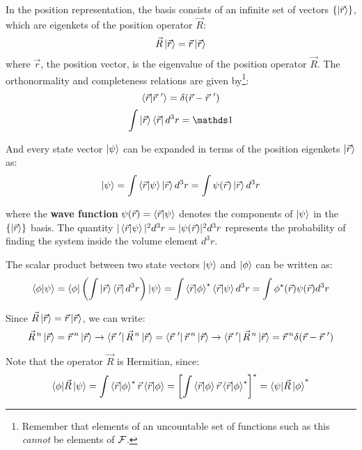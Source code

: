 In the position representation, the basis consists of an infinite set of vectors $\{\ket{\vec{r}}\}$, which are eigenkets of the position operator $\vec{R}$:
\begin{equation}
    \vec{R}\ket{\vec{r}} = \vec{r}\ket{\vec{r}}
\end{equation}
where $\vec{r}$, the position vector, is the eigenvalue of the position operator $\vec{R}$. The orthonormality and completeness relations are given by\footnote{Remember that elements of an uncountable set of functions such as this \textit{cannot} be elements of $\mathcal{F}$.}:
\begin{equation}
    \braket{\vec{r}|\vec{r}\ '} = \delta(\vec{r} - \vec{r}\ ')
\end{equation} 
\begin{equation}
    \int \ket{\vec{r}}\bra{\vec{r}} d^3r = \Imat
\end{equation}

And every state vector $\ket{\psi}$ can be expanded in terms of the position eigenkets $\ket{\vec{r}}$ as:
\begin{equation}
    \ket{\psi} = \int \braket{\vec{r}|\psi} \ket{\vec{r}} d^3 r = \int \psi(\vec{r}) \ket{\vec{r}} d^3 r
\end{equation}

where the \textbf{wave function} $\psi(\vec{r}) = \braket{\vec{r}|\psi}$ denotes the components of $\ket{\psi}$ in the $\{\ket{\vec{r}}\}$ basis. The quantity $|\braket{\vec{r}|\psi}|^2d^3 r = |\psi(\vec{r})|^2d^3r$ represents the probability of finding the system inside the volume element $d^3r$.

The scalar product between two state vectors $\ket{\psi}$ and $\ket{\phi}$ can be written as:
\begin{equation}
    \braket{\phi|\psi} = \bra{\phi}\left(\int \ket{\vec{r}}\bra{\vec{r}}d^3r\right)\ket{\psi} = \int \braket{\vec{r}|\phi}^*\braket{\vec{r}|\psi} d^3r = \int \phi^*(\vec{r})\psi(\vec{r}) d^3r
\end{equation}

Since $\vec{R}\ket{\vec{r}} = \vec{r}\ket{\vec{r}}$, we can write:
\begin{equation}
    \vec{R}^{\, n}\ket{\vec{r}} = \vec{r}\, ^n\ket{\vec{r}} \to \bra{\vec{r}\ '}\vec{R}^{\, n}\ket{\vec{r}} = \bra{\vec{r}\ '}\vec{r}\, ^n\ket{\vec{r}} \to \bra{\vec{r}\ '}\vec{R}^{\, n}\ket{\vec{r}} = \vec{r}\, ^n\delta(\vec{r} - \vec{r}\ ')
\end{equation}

Note that the operator $\vec{R}$ is Hermitian, since:
\begin{equation}
    \braket{\phi|\vec{R}\,|\psi} = \int \braket{\vec{r}|\phi}^*\vec{r}\braket{\vec{r}|\phi} = \left[\int \braket{\vec{r}|\phi}\vec{r}\braket{\vec{r}|\phi}^*\right]^* = \braket{\psi|\vec{R}\,|\phi}^*
\end{equation}

